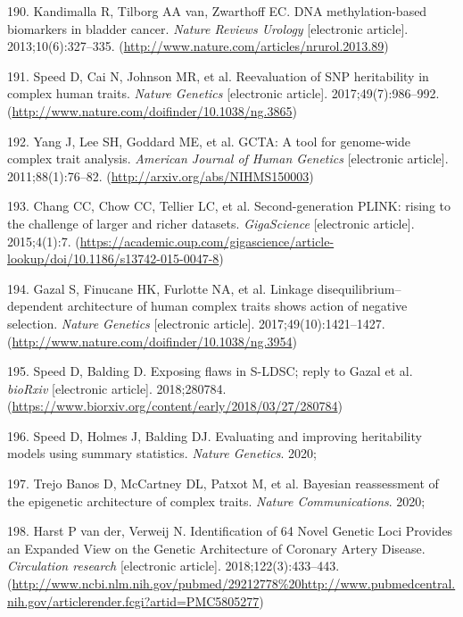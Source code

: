 \documentclass[11pt,twoside]{bristolthesis}
\newenvironment{cslreferences}%
  {}%
  {\par}
\begin{document}
\begin{cslreferences}
\leavevmode\hypertarget{ref-Kandimalla2013}{}%
190. Kandimalla R, Tilborg AA van, Zwarthoff EC. DNA methylation-based biomarkers in bladder cancer. \emph{Nature Reviews Urology} {[}electronic article{]}. 2013;10(6):327--335. (\url{http://www.nature.com/articles/nrurol.2013.89})

\leavevmode\hypertarget{ref-Speed2017}{}%
191. Speed D, Cai N, Johnson MR, et al. Reevaluation of SNP heritability in complex human traits. \emph{Nature Genetics} {[}electronic article{]}. 2017;49(7):986--992. (\url{http://www.nature.com/doifinder/10.1038/ng.3865})

\leavevmode\hypertarget{ref-Yang2011}{}%
192. Yang J, Lee SH, Goddard ME, et al. GCTA: A tool for genome-wide complex trait analysis. \emph{American Journal of Human Genetics} {[}electronic article{]}. 2011;88(1):76--82. (\url{http://arxiv.org/abs/NIHMS150003})

\leavevmode\hypertarget{ref-Chang2015}{}%
193. Chang CC, Chow CC, Tellier LC, et al. Second-generation PLINK: rising to the challenge of larger and richer datasets. \emph{GigaScience} {[}electronic article{]}. 2015;4(1):7. (\url{https://academic.oup.com/gigascience/article-lookup/doi/10.1186/s13742-015-0047-8})

\leavevmode\hypertarget{ref-Gazal2017}{}%
194. Gazal S, Finucane HK, Furlotte NA, et al. Linkage disequilibrium--dependent architecture of human complex traits shows action of negative selection. \emph{Nature Genetics} {[}electronic article{]}. 2017;49(10):1421--1427. (\url{http://www.nature.com/doifinder/10.1038/ng.3954})

\leavevmode\hypertarget{ref-Speed2018}{}%
195. Speed D, Balding D. Exposing flaws in S-LDSC; reply to Gazal et al. \emph{bioRxiv} {[}electronic article{]}. 2018;280784. (\url{https://www.biorxiv.org/content/early/2018/03/27/280784})

\leavevmode\hypertarget{ref-Speed2020}{}%
196. Speed D, Holmes J, Balding DJ. Evaluating and improving heritability models using summary statistics. \emph{Nature Genetics}. 2020;

\leavevmode\hypertarget{ref-TrejoBanos2020}{}%
197. Trejo Banos D, McCartney DL, Patxot M, et al. Bayesian reassessment of the epigenetic architecture of complex traits. \emph{Nature Communications}. 2020;

\leavevmode\hypertarget{ref-VanderHarst2018}{}%
198. Harst P van der, Verweij N. Identification of 64 Novel Genetic Loci Provides an Expanded View on the Genetic Architecture of Coronary Artery Disease. \emph{Circulation research} {[}electronic article{]}. 2018;122(3):433--443. (\url{http://www.ncbi.nlm.nih.gov/pubmed/29212778\%20http://www.pubmedcentral.nih.gov/articlerender.fcgi?artid=PMC5805277})


\end{cslreferences}
\end{document}
